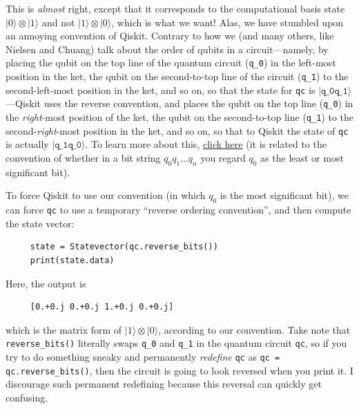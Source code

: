 \documentclass[10pt, cm]{article}
\renewcommand{\ket}[1]{|#1\rangle}		%
\begin{document}
\begin{enumerate}[(a)]
This is \emph{almost} right, except that it corresponds to the computational basis state $\ket{0} \otimes \ket{1}$ and not $\ket{1} \otimes \ket{0}$, which is what we want! Alas, we have stumbled upon an annoying convention of Qiskit. Contrary to how we (and many others, like Nielsen and Chuang) talk about the order of qubits in a circuit---namely, by placing the qubit on the top line of the quantum circuit (\texttt{q\_0}) in the left-most position in the ket, the qubit on the second-to-top line of the circuit (\texttt{q\_1}) to the second-left-most position in the ket, and so on, so that the state for \texttt{qc} is $\ket{\texttt{q\_0q\_1}}$---Qiskit uses the reverse convention, and places the qubit on the top line (\texttt{q\_0}) in the \emph{right}-most position of the ket, the qubit on the second-to-top line (\texttt{q\_1}) to the second-\emph{right}-most position in the ket, and so on, so that to Qiskit the state of \texttt{qc} is actually $\ket{\texttt{q\_1q\_0}}$. To learn more about this, \href{https://docs.quantum.ibm.com/guides/bit-ordering}{click here} (it is related to the convention of whether in a bit string $q_0q_1\dots q_n$ you regard $q_0$ as the least or most significant bit). 

To force Qiskit to use our convention (in which $q_0$ is the most significant bit), we can force \texttt{qc} to use a temporary ``reverse ordering convention'', and then compute the state vector:
\begin{verbatim}
     state = Statevector(qc.reverse_bits())
     print(state.data)
\end{verbatim}
Here, the output is 
\begin{verbatim}
     [0.+0.j 0.+0.j 1.+0.j 0.+0.j]
\end{verbatim}
which is the matrix form of $\ket{1} \otimes \ket{0}$, according to our convention. Take note that \texttt{reverse\_bits()} literally swaps \texttt{q\_0} and \texttt{q\_1} in the quantum circuit \texttt{qc}, so if you try to do something sneaky and permanently \emph{redefine} \texttt{qc} as \texttt{qc = qc.reverse\_bits()}, then the circuit is going to look reversed when you print it. I discourage such permanent redefining because this reversal can quickly get confusing.


\end{enumerate}
\end{document}
